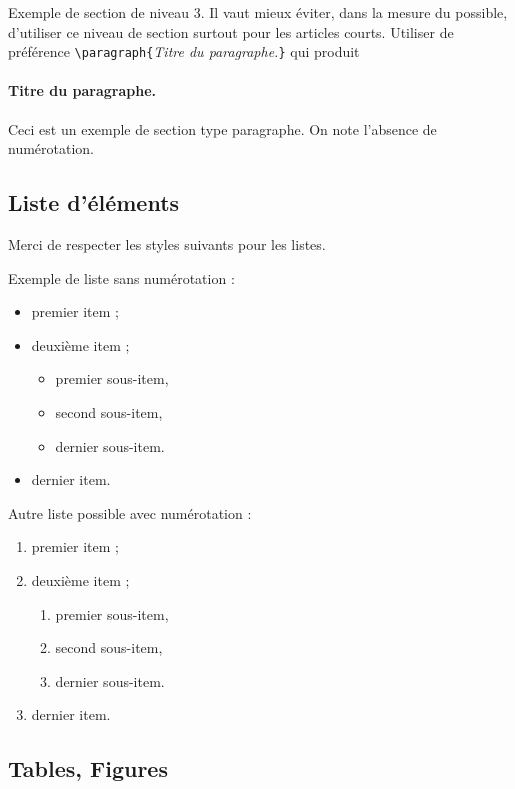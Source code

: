 \documentclass[a4paper,pagenum,french,showlayout]{rnti}
\begin{document}
Exemple de section de niveau 3. Il vaut mieux éviter, dans la mesure
du possible, d'utiliser ce niveau de section surtout pour les
articles courts. Utiliser de préférence
\verb+\paragraph{+\textit{Titre du paragraphe.}\verb+}+ qui produit

\paragraph{Titre du paragraphe.} Ceci est un exemple de section type
paragraphe. On note l'absence de numérotation.

\subsection{Liste d'éléments}

Merci de respecter les styles suivants pour les listes.

Exemple de liste sans numérotation :
\begin{itemize}
    \item premier item ;
    \item deuxième item ;
    \begin{itemize}
      \item premier sous-item,
      \item second sous-item,
      \item dernier sous-item.
  \end{itemize}
  \item dernier item.
\end{itemize}

Autre liste possible avec numérotation :
\begin{enumerate}
    \item premier item ;
    \item deuxième item ;
    \begin{enumerate}
      \item premier sous-item,
      \item second sous-item,
      \item dernier sous-item.
    \end{enumerate}
  \item dernier item.
\end{enumerate}

\subsection{Tables, Figures}
\end{document}
